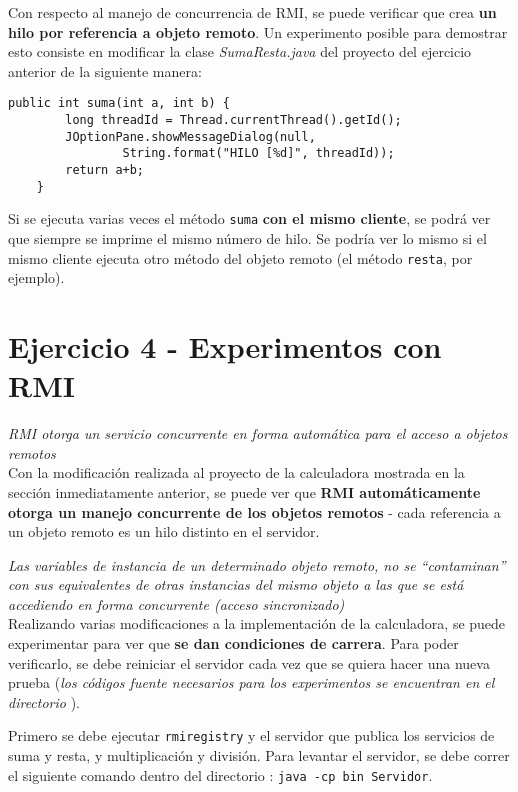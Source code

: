 Con respecto al manejo de concurrencia de RMI, se puede verificar que crea \textbf{un hilo por referencia a objeto remoto}. Un experimento posible para demostrar esto consiste en modificar la clase \emph{SumaResta.java} del proyecto del ejercicio anterior de la siguiente manera:

\begin{lstlisting}[title={Modificar el método \texttt{suma} para poder ver el hilo en el que corre}]
    public int suma(int a, int b) {
        long threadId = Thread.currentThread().getId();
        JOptionPane.showMessageDialog(null, 
                String.format("HILO [%d]", threadId));
        return a+b;
    }
\end{lstlisting}

Si se ejecuta varias veces el método \texttt{suma} \textbf{con el mismo cliente}, se podrá ver que siempre se imprime el mismo número de hilo. Se podría ver lo mismo si el mismo cliente ejecuta otro método del objeto remoto (el método \texttt{resta}, por ejemplo).  

\section{Ejercicio 4 - Experimentos con RMI}

\emph{RMI otorga un servicio concurrente en forma automática para el acceso a objetos remotos} 
~\\

Con la modificación realizada al proyecto de la calculadora mostrada en la sección inmediatamente anterior, se puede ver que \textbf{RMI automáticamente otorga un manejo concurrente de los objetos remotos} - cada referencia a un objeto remoto es un hilo distinto en el servidor.

\emph{Las variables de instancia de un determinado objeto remoto, no se “contaminan” con sus equivalentes de otras instancias del mismo objeto a las que se está accediendo en forma concurrente (acceso sincronizado)} 
~\\

Realizando varias modificaciones a la implementación de la calculadora, se puede experimentar para ver que \textbf{se dan condiciones de carrera}. Para poder verificarlo, se debe reiniciar el servidor cada vez que se quiera hacer una nueva prueba (\emph{los códigos fuente necesarios para los experimentos se encuentran en el directorio }).

Primero se debe ejecutar \texttt{rmiregistry} y el servidor que publica los servicios de suma y resta, y multiplicación y división. Para levantar el servidor, se debe correr el siguiente comando dentro del directorio : \texttt{java -cp bin Servidor}. 

